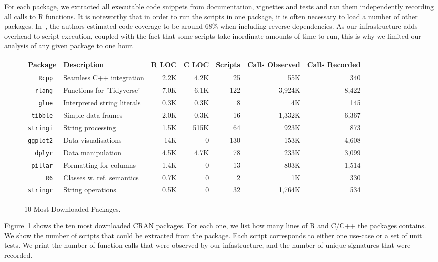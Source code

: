\documentclass[acmsmall,10pt,review,anonymous]{acmart}\settopmatter{printfolios=true,printccs=false,printacmref=false}
\begin{document}
For each package, we extracted all executable code snippets from
documentation, vignettes and tests and ran them independently recording all
calls to R functions.  It is noteworthy that in order to run the scripts in
one package, it is often necessary to load a number of other packages.
In~\cite{issta18}, the authors estimated code coverage to be around 68\%
when including reverse dependencies.  As our infrastructure adds overhead to
script execution, coupled with the fact that some scripts take inordinate
amounts of time to run, this is why we limited our analysis of any given
package to one hour.  

\begin{figure}[!th]{\footnotesize\begin{tabular}{@{}r||l|r|r|r|r|r@{}}\hline
\bf Package & \bf Description & \bf R LOC &\bf C LOC &\bf Scripts & \bf Calls Observed & \bf Calls Recorded \\
\hline
\tt Rcpp  & Seamless C++ integration & 2.2K & 4.2K & 25 & 55K & 340 \\
\tt rlang & Functions for 'Tidyverse' & 7.0K & 6.1K & 122 & 3,924K & 8,422 \\
\tt glue  & Interpreted string literals & 0.3K & 0.3K & 8 & 4K & 145 \\
\tt tibble & Simple data frames & 2.0K & 0.3K & 16 & 1,332K & 6,367 \\
\tt stringi &  String processing & 1.5K & 515K & 64 & 923K & 873 \\
\tt ggplot2 & Data visualisations & 14K & 0 & 130 & 153K & 4,608 \\
\tt dplyr  &  Data manipulation & 4.5K & 4.7K & 78 & 233K & 3,099 \\
\tt pillar & Formatting for columns & 1.4K & 0 & 13 & 803K & 1,514 \\
\tt R6 & Classes w. ref. semantics & 0.7K & 0 & 2 & 1K & 330 \\
\tt stringr & String operations & 0.5K & 0 & 32 & 1,764K & 534 \\
\end{tabular}}\caption{10 Most Downloaded Packages.}\label{most}
\end{figure}

Figure~\ref{most} shows the ten most downloaded CRAN packages.  For each
one, we list how many lines of R and C/C++ the packages contains.  We show
the number of scripts that could be extracted from the package. Each script
corresponds to either one use-case or a set of unit tests. We print the
number of function calls that were observed by our infastructure, and the
number of unique signatures that were recorded.
\end{document}
